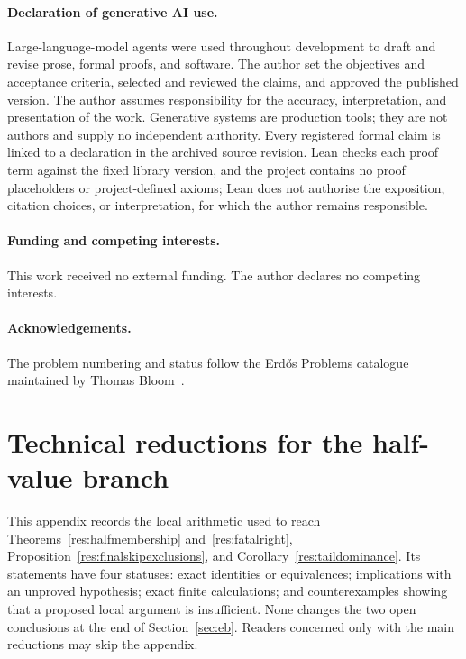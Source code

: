 \documentclass[11pt]{article}
\theoremstyle{definition}
\theoremstyle{remark}
\begin{document}
\paragraph{Declaration of generative AI use.} Large-language-model agents were
used throughout development to draft and revise prose, formal proofs, and
software.  The author set the objectives and acceptance criteria, selected and
reviewed the claims, and approved the published version.  The author assumes
responsibility for the accuracy, interpretation, and presentation of the work.
Generative systems are production tools; they are not authors and supply no
independent authority.  Every registered formal claim is linked to a
declaration in the archived source revision.  Lean checks each proof term
against the fixed library version, and the project contains no proof
placeholders or project-defined axioms; Lean does not authorise the exposition,
citation choices, or interpretation, for which the author remains responsible.

\paragraph{Funding and competing interests.} This work received no external
funding. The author declares no competing interests.

\paragraph{Acknowledgements.} The problem numbering and status follow the
Erd\H{o}s Problems catalogue maintained by Thomas Bloom~\cite{erdosproblems}.

\appendix
\section{Technical reductions for the half-value branch}
\label{app:half-technical}

This appendix records the local arithmetic used to reach
Theorems~\ref{res:halfmembership} and~\ref{res:fatalright},
Proposition~\ref{res:finalskipexclusions}, and
Corollary~\ref{res:taildominance}.  Its statements have four statuses: exact
identities or equivalences; implications with an unproved hypothesis; exact
finite calculations; and counterexamples showing that a proposed local
argument is insufficient.  None changes the two open conclusions at the end
of Section~\ref{sec:eb}.  Readers concerned only with the main reductions may
skip the appendix.
\end{document}
